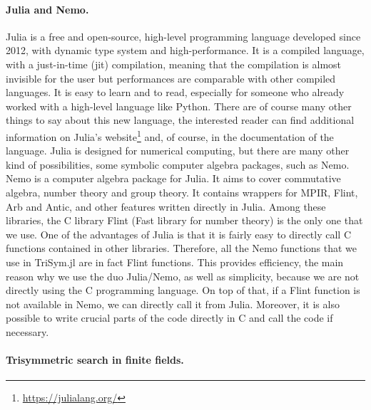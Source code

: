 \paragraph{Julia and Nemo.} Julia is a free and open-source, high-level programming language
developed since 2012, with dynamic type system and high-performance. It is
a compiled language, with a just-in-time (jit) compilation, meaning that the
compilation is almost invisible for the user but performances are comparable
with other compiled languages. It is easy to learn and to read, especially
for someone who already worked with a high-level language like Python.
There are of course many other things to say about this new language, the
interested reader can find additional information on Julia’s
website\footnote{\url{https://julialang.org/}} and, of
course, in the documentation of the language. Julia is designed for numerical
computing, but there are many other kind of possibilities, \eg some symbolic computer algebra packages, such as
Nemo. Nemo is a computer algebra package for Julia. It aims to cover
commutative algebra, number theory and group theory. It contains wrappers
for MPIR, Flint, Arb and Antic, and other features written directly in Julia. Among
these libraries, the C library Flint (Fast library for number theory) is the
only one that we use.
One of the advantages of Julia is that it is fairly easy
to directly call C functions contained in other libraries. Therefore, all the
Nemo functions that we use in TriSym.jl are in fact Flint functions. This
provides efficiency, the main reason why we use the duo Julia/Nemo, as well
as simplicity, because we are not directly using the C programming language.
On top of that, if a Flint function is not available in Nemo, we can directly
call it from Julia. Moreover, it is also possible to write crucial parts of the code
directly in C and call the code if necessary.

\paragraph{Trisymmetric search in finite fields.}

